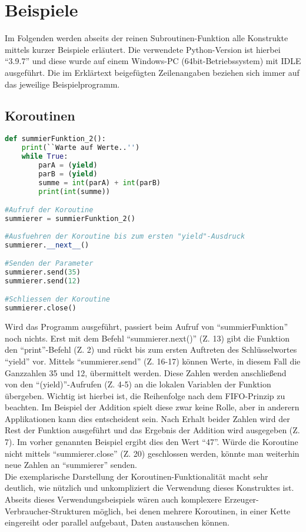\chapter{Beispiele}\label{ch:method}
Im Folgenden werden abseits der reinen Subroutinen-Funktion alle Konstrukte mittels kurzer Beispiele erläutert. Die verwendete Python-Version ist hierbei ``3.9.7'' und diese wurde auf einem Windows-PC (64bit-Betriebssystem) mit IDLE ausgeführt. Die im Erklärtext beigefügten Zeilenangaben beziehen sich immer auf das jeweilige Beispielprogramm.
\section{Koroutinen}
\begin{lstlisting}[language=Python,caption={Beispiel f"ur die Verwendung von Koroutinen},captionpos=b]
def summierFunktion_2():
    print(``Warte auf Werte..'')
    while True:
        parA = (yield)
        parB = (yield)     
        summe = int(parA) + int(parB)    
        print(int(summe))

#Aufruf der Koroutine
summierer = summierFunktion_2()
        
#Ausfuehren der Koroutine bis zum ersten "yield"-Ausdruck
summierer.__next__()

#Senden der Parameter
summierer.send(35)
summierer.send(12)

#Schliessen der Koroutine
summierer.close()        
\end{lstlisting}

Wird das Programm ausgeführt, passiert beim Aufruf von ``summierFunktion'' noch nichts. Erst mit dem Befehl ``summierer.\textunderscore\textunderscore next\textunderscore\textunderscore ()'' (Z. 13) gibt die Funktion den ``print''-Befehl (Z. 2) und rückt bis zum ersten Auftreten des Schlüsselwortes ``yield'' vor. Mittels ``summierer.send'' (Z. 16-17) können Werte, in diesem Fall die Ganzzahlen 35 und 12, übermittelt werden. Diese Zahlen werden anschließend von den ``(yield)''-Aufrufen (Z. 4-5) an die lokalen Variablen der Funktion übergeben. Wichtig ist hierbei ist, die Reihenfolge nach dem FIFO-Prinzip zu beachten. Im Beispiel der Addition spielt diese zwar keine Rolle, aber in anderern Applikationen kann dies entscheident sein. Nach Erhalt beider Zahlen wird der Rest der Funktion ausgeführt und das Ergebnis der Addition wird ausgegeben (Z. 7). Im vorher genannten Beispiel ergibt dies den Wert ``47''. Würde die Koroutine nicht mittels ``summierer.close'' (Z. 20) geschlossen werden, könnte man weiterhin neue Zahlen an ``summierer'' senden.\\
Die exemplarische Darstellung der Koroutinen-Funktionalität macht sehr deutlich, wie nützlich und unkompliziert die Verwendung dieses Konstruktes ist. Abseits dieses Verwendungsbeispiels wären auch komplexere Erzeuger-Verbraucher-Strukturen möglich, bei denen mehrere Koroutinen, in einer Kette eingereiht oder parallel aufgebaut, Daten austauschen können.


